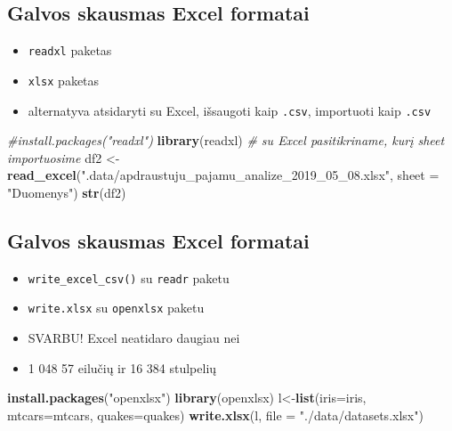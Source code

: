 \documentclass[]{article}
\newenvironment{Shaded}{\begin{snugshade}}{\end{snugshade}}
\newcommand{\KeywordTok}[1]{\textcolor[rgb]{0.13,0.29,0.53}{\textbf{#1}}}
\newcommand{\DataTypeTok}[1]{\textcolor[rgb]{0.13,0.29,0.53}{#1}}
\newcommand{\StringTok}[1]{\textcolor[rgb]{0.31,0.60,0.02}{#1}}
\newcommand{\CommentTok}[1]{\textcolor[rgb]{0.56,0.35,0.01}{\textit{#1}}}
\newcommand{\NormalTok}[1]{#1}
\providecommand{\tightlist}{%
  \setlength{\itemsep}{0pt}\setlength{\parskip}{0pt}}
\begin{document}
\subsection{Galvos skausmas Excel
formatai}\label{galvos-skausmas-excel-formatai-1}

\begin{itemize}
\tightlist
\item
  \texttt{readxl} paketas
\item
  \texttt{xlsx} paketas
\item
  alternatyva atsidaryti su Excel, išsaugoti kaip \texttt{.csv},
  importuoti kaip \texttt{.csv}
\end{itemize}

\begin{Shaded}
\begin{Highlighting}[]
\CommentTok{#install.packages("readxl")}
\KeywordTok{library}\NormalTok{(readxl)}
\CommentTok{# su Excel pasitikriname, kurį sheet importuosime}
\NormalTok{df2 <-}\StringTok{ }\KeywordTok{read_excel}\NormalTok{(}\StringTok{".data/apdraustuju_pajamu_analize_2019_05_08.xlsx"}\NormalTok{, }
                  \DataTypeTok{sheet =} \StringTok{"Duomenys"}\NormalTok{)}
\KeywordTok{str}\NormalTok{(df2)}
\end{Highlighting}
\end{Shaded}

\subsection{Galvos skausmas Excel
formatai}\label{galvos-skausmas-excel-formatai-2}

\begin{itemize}
\tightlist
\item
  \texttt{write\_excel\_csv()} su \texttt{readr} paketu
\item
  \texttt{write.xlsx} su \texttt{openxlsx} paketu
\item
  SVARBU! Excel neatidaro daugiau nei
\item
  1 048 57 eilučių ir 16 384 stulpelių
\end{itemize}

\begin{Shaded}
\begin{Highlighting}[]
\KeywordTok{install.packages}\NormalTok{(}\StringTok{"openxlsx"}\NormalTok{)}
\KeywordTok{library}\NormalTok{(openxlsx)}
\NormalTok{l<-}\KeywordTok{list}\NormalTok{(}\DataTypeTok{iris=}\NormalTok{iris, }\DataTypeTok{mtcars=}\NormalTok{mtcars, }\DataTypeTok{quakes=}\NormalTok{quakes)}
\KeywordTok{write.xlsx}\NormalTok{(l, }\DataTypeTok{file =} \StringTok{"./data/datasets.xlsx"}\NormalTok{)}
\end{Highlighting}
\end{Shaded}
\end{document}
